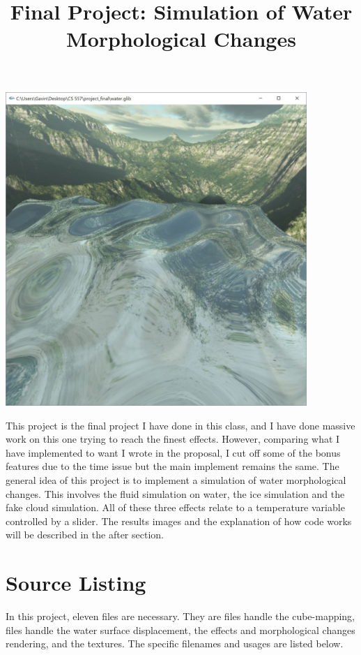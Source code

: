 \documentclass[letterpaper,14pt,titlepage,fleqn]{article}
\author{\name}
\title{Final Project: Simulation of Water Morphological Changes}
\begin{document}
\maketitle
\begin{center}
	\includegraphics[width=4.5in]{final1.jpg}
\end{center}
This project is the final project I have done in this class, and I have done massive work on this one trying to reach the finest effects. However, comparing what I have implemented to want I wrote in the proposal, I cut off some of the bonus features due to the time issue but the main implement remains the same. The general idea of this project is to implement a simulation of water morphological changes. This involves the fluid simulation on water, the ice simulation and the fake cloud simulation. All of these three effects relate to a temperature variable controlled by a slider. The results images and the explanation of how code works will be described in the after section. 

\section{Source Listing}
In this project, eleven files are necessary. They are files handle the cube-mapping, files handle the water surface displacement, the effects and morphological changes rendering, and the textures. The specific filenames and usages are listed below.
\end{document}

